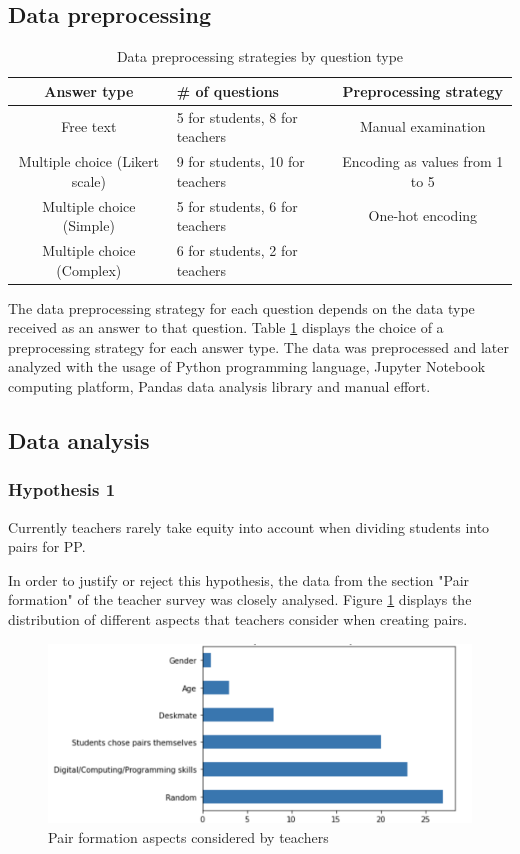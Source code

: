 \documentclass[conference]{IEEEtran}
\begin{document}
\subsection{Data preprocessing}
\begin{table}[h]
    \begin{tabular}{ |c|p{50px}|c| }
        \hline
        Answer type & \# of questions & Preprocessing strategy\\
        \hline
        Free text & 5 for students, 8 for teachers & Manual examination\\
        \hline
        Multiple choice (Likert scale) & 9 for students, 10 for teachers & Encoding as values from 1 to 5\\
        \hline
        Multiple choice (Simple) & 5 for students, 6 for teachers & One-hot encoding \\
        \hline
        Multiple choice (Complex) & 6 for students, 2 for teachers &  \\ 
        \hline
    \end{tabular}
    \caption{Data preprocessing strategies by question type}
    \label{tab:table1}
\end{table}

The data preprocessing strategy for each question depends on the data type received as an answer to that question. Table \ref{tab:table1} displays the choice of a preprocessing strategy for each answer type. The data was preprocessed and later analyzed with the usage of Python programming language, Jupyter Notebook computing platform, Pandas data analysis library and manual effort. 

\subsection{Data analysis}
\subsubsection{Hypothesis 1}
Currently teachers rarely take equity into account when dividing students into pairs for PP.

In order to justify or reject this hypothesis, the data from the section "Pair formation" of the teacher survey was closely analysed. Figure \ref{fig:aspectsPairFormation} displays the distribution of different aspects that teachers consider when creating pairs.

\begin{figure}[h]
\includegraphics[scale=0.42]{aspects-pair-formation.png}
\caption{Pair formation aspects considered by teachers}
\label{fig:aspectsPairFormation}
\end{figure}
\end{document}
